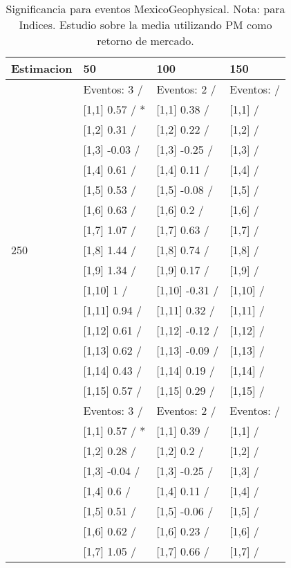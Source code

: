 \begin{table}

\caption{Significancia para eventos MexicoGeophysical. Nota: para Indices. Estudio sobre la media utilizando PM como retorno de mercado.}
\centering
\begin{tabular}[t]{llll}
\toprule
Estimacion & 50 & 100 & 150\\
\midrule
 & Eventos:  3 / & Eventos:  2 / & Eventos:   /\\
 & {}[1,1] 0.57  / * & {}[1,1] 0.38  / & {}[1,1]  /\\
 & {}[1,2] 0.31  / & {}[1,2] 0.22  / & {}[1,2]  /\\
 & {}[1,3] -0.03  / & {}[1,3] -0.25  / & {}[1,3]  /\\
 & {}[1,4] 0.61  / & {}[1,4] 0.11  / & {}[1,4]  /\\
\addlinespace
 & {}[1,5] 0.53  / & {}[1,5] -0.08  / & {}[1,5]  /\\
 & {}[1,6] 0.63  / & {}[1,6] 0.2  / & {}[1,6]  /\\
 & {}[1,7] 1.07  / & {}[1,7] 0.63  / & {}[1,7]  /\\
250 & {}[1,8] 1.44  / & {}[1,8] 0.74  / & {}[1,8]  /\\
 & {}[1,9] 1.34  / & {}[1,9] 0.17  / & {}[1,9]  /\\
\addlinespace
 & {}[1,10] 1  / & {}[1,10] -0.31  / & {}[1,10]  /\\
 & {}[1,11] 0.94  / & {}[1,11] 0.32  / & {}[1,11]  /\\
 & {}[1,12] 0.61  / & {}[1,12] -0.12  / & {}[1,12]  /\\
 & {}[1,13] 0.62  / & {}[1,13] -0.09  / & {}[1,13]  /\\
 & {}[1,14] 0.43  / & {}[1,14] 0.19  / & {}[1,14]  /\\
\addlinespace
 & {}[1,15] 0.57  / & {}[1,15] 0.29  / & {}[1,15]  /\\
 & Eventos:  3 / & Eventos:  2 / & Eventos:   /\\
 & {}[1,1] 0.57  / * & {}[1,1] 0.39  / & {}[1,1]  /\\
 & {}[1,2] 0.28  / & {}[1,2] 0.2  / & {}[1,2]  /\\
 & {}[1,3] -0.04  / & {}[1,3] -0.25  / & {}[1,3]  /\\
\addlinespace
 & {}[1,4] 0.6  / & {}[1,4] 0.11  / & {}[1,4]  /\\
 & {}[1,5] 0.51  / & {}[1,5] -0.06  / & {}[1,5]  /\\
 & {}[1,6] 0.62  / & {}[1,6] 0.23  / & {}[1,6]  /\\
 & {}[1,7] 1.05  / & {}[1,7] 0.66  / & {}[1,7]  /\\

\end{tabular}
\end{table}
